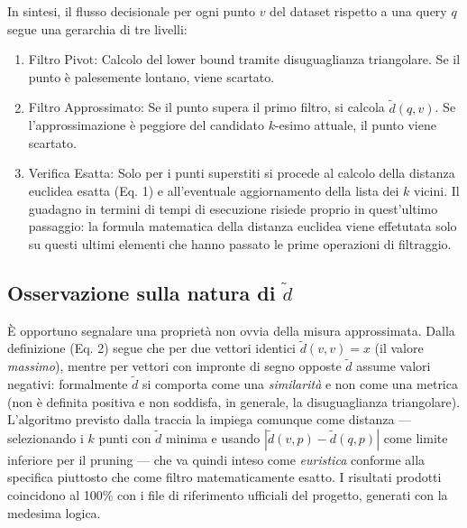 In sintesi, il flusso decisionale per ogni punto $v$ del dataset rispetto a una query $q$ segue una gerarchia di tre livelli:
\begin{enumerate}
	\item Filtro Pivot: Calcolo del lower bound tramite disuguaglianza 	triangolare. Se il punto è palesemente lontano, viene scartato.
	\item Filtro Approssimato: Se il punto supera il primo filtro, si calcola $\tilde{d}(q, v)$. Se l'approssimazione è peggiore del candidato $k$-esimo attuale, il punto viene scartato.
	\item Verifica Esatta: Solo per i punti superstiti si procede al calcolo della distanza euclidea esatta (Eq. 1) e all'eventuale aggiornamento della lista dei $k$ vicini. Il guadagno in termini di tempi di esecuzione risiede proprio in quest'ultimo passaggio: la formula matematica della distanza euclidea viene effetutata 			solo su questi ultimi elementi che hanno passato le prime operazioni di filtraggio.
\end{enumerate}

\subsection{Osservazione sulla natura di $\tilde{d}$}
È opportuno segnalare una proprietà non ovvia della misura approssimata. Dalla definizione (Eq. 2) segue che per due vettori identici $\tilde{d}(v,v) = x$ (il valore \emph{massimo}), mentre per vettori con impronte di segno opposte $\tilde{d}$ assume valori negativi: formalmente $\tilde{d}$ si comporta come una \emph{similarità} e non come una metrica (non è definita positiva e non soddisfa, in generale, la disuguaglianza triangolare). L'algoritmo previsto dalla traccia la impiega comunque come distanza — selezionando i $k$ punti con $\tilde{d}$ minima e usando $|\tilde{d}(v,p) - \tilde{d}(q,p)|$ come limite inferiore per il pruning — che va quindi inteso come \emph{euristica} conforme alla specifica piuttosto che come filtro matematicamente esatto. I risultati prodotti coincidono al 100\% con i file di riferimento ufficiali del progetto, generati con la medesima logica.